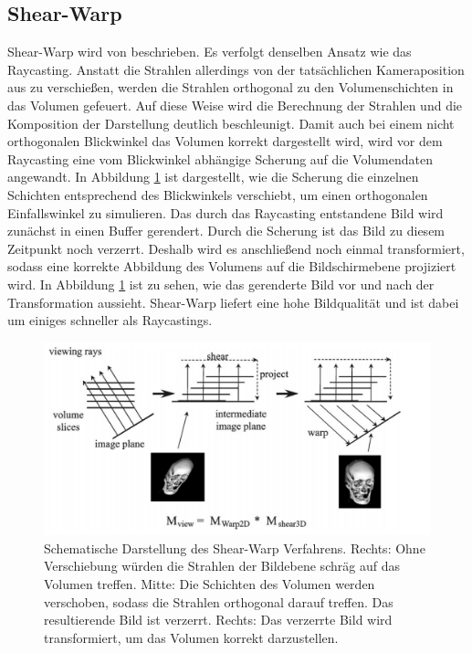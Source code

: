 \subsection{Shear-Warp}

Shear-Warp wird von \cite{Lacroute94} beschrieben. Es verfolgt denselben Ansatz wie das Raycasting. Anstatt die Strahlen allerdings von der tatsächlichen Kameraposition aus zu verschießen, werden die Strahlen orthogonal zu den Volumenschichten in das Volumen gefeuert. Auf diese Weise wird die Berechnung der Strahlen und die Komposition der Darstellung deutlich beschleunigt. 
Damit auch bei einem nicht orthogonalen Blickwinkel das Volumen korrekt dargestellt wird, wird vor dem Raycasting eine vom Blickwinkel abhängige Scherung auf die Volumendaten angewandt. In Abbildung \ref{img:shearwarp} ist dargestellt, wie die Scherung die einzelnen Schichten entsprechend des Blickwinkels verschiebt, um einen orthogonalen Einfallswinkel zu simulieren. 
Das durch das Raycasting entstandene Bild wird zunächst in einen Buffer gerendert. Durch die Scherung ist das Bild zu diesem Zeitpunkt noch verzerrt. Deshalb wird es anschließend noch einmal transformiert, sodass eine korrekte Abbildung des Volumens auf die Bildschirmebene projiziert wird. In Abbildung \ref{img:shearwarp} ist zu sehen, wie das gerenderte Bild vor und nach der Transformation aussieht. 
Shear-Warp liefert eine hohe Bildqualität und ist dabei um einiges schneller als Raycastings. 

\begin{figure}[!htb]
	\centering
	\includegraphics[width=0.7\linewidth]{images/shearwarp.png}
	\caption{Schematische Darstellung des Shear-Warp Verfahrens. Rechts: Ohne Verschiebung würden die Strahlen der Bildebene schräg auf das Volumen treffen. Mitte: Die Schichten des Volumen werden verschoben, sodass die Strahlen orthogonal darauf treffen. Das resultierende Bild ist verzerrt. Rechts: Das verzerrte Bild wird transformiert, um das Volumen korrekt darzustellen.}
	\label{img:shearwarp}
\end{figure}
\FloatBarrier

